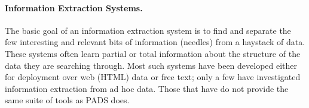 

\paragraph*{Information Extraction Systems.}

The basic goal of an information extraction system is 
to find and separate the few interesting and relevant bits of information 
(needles) from a haystack of data.  These systems often learn partial
or total information about the structure of the data they are searching
through.  Most such systems have been developed either for
deployment over web (HTML) data or free text; only a few have investigated
information extraction from ad hoc data.  Those that have do not
provide the same suite of tools as PADS does.

